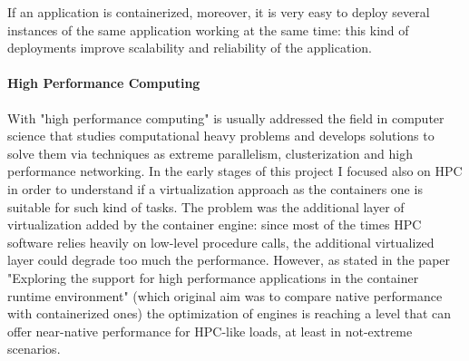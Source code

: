   If an application is containerized, moreover, it is very easy to deploy several instances of the same application working at the same time: this kind of deployments improve scalability and reliability of the application.\\

\paragraph{High Performance Computing}
  With "high performance computing" is usually addressed the field in computer science that studies computational heavy problems and develops solutions to solve them via techniques as extreme parallelism, clusterization and high performance networking. In the early stages of this project I focused also on HPC in order to understand if a virtualization approach as the containers one is suitable for such kind of tasks. The problem was the additional layer of virtualization added by the container engine: since most of the times HPC software relies heavily on low-level procedure calls, the additional virtualized layer could degrade too much the performance. However, as stated in the paper "Exploring the support for high performance applications in the container runtime environment"\cite{containershpc2} (which original aim was to compare native performance with containerized ones) the optimization of engines is reaching a level that can offer near-native performance for HPC-like loads, at least in not-extreme scenarios.
